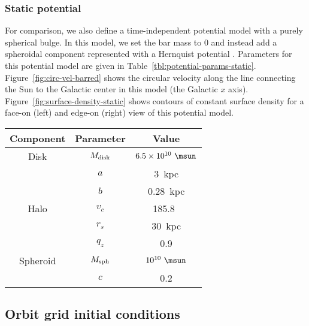 \documentclass[letterpaper,12pt,preprint]{aastex}
\begin{document}
\subsubsection{Static potential}

For comparison, we also define a time-independent potential model with a purely spherical bulge. In this model, we set the bar mass to 0 and instead add a spheroidal component represented with a Hernquist potential \citep{hernquist90}. Parameters for this potential model are given in Table~\ref{tbl:potential-params-static}. Figure~\ref{fig:circ-vel-barred} shows the circular velocity along the line connecting the Sun to the Galactic center in this model (the Galactic $x$ axis). Figure~\ref{fig:surface-density-static} shows contours of constant surface density for a face-on (left) and edge-on (right) view of this potential model.

\begin{table*}[ht]
\begin{center}
	\begin{tabular}{ c | c | c }
	         \toprule
	         Component & Parameter & Value \\\toprule
		Disk & $M_{\rm disk}$ & $6.5 \times 10^{10}~\msun$ \\
		& $a$ & 3~{\rm kpc}\\
		& $b$ & 0.28~{\rm kpc} \\\midrule
	         Halo & $v_c$ & 185.8~\kms\\
		& $r_s$ & 30~kpc \\
		& $q_z$ & 0.9 \\\midrule
		Spheroid & $M_{\rm sph}$ & $10^{10}~\msun$ \\
		& $c$ & 0.2 \\
		\bottomrule
		\end{tabular}
	\caption{Same as Table~\ref{tbl:potential-params-barred}, except: the disk mass is increased to account for removing the bar component, a spheroidal bulge component is added. \label{tbl:potential-params-static}}
\end{center}
\end{table*}

\subsection{Orbit grid initial conditions}\label{sec:orbit-grids}
\end{document}
